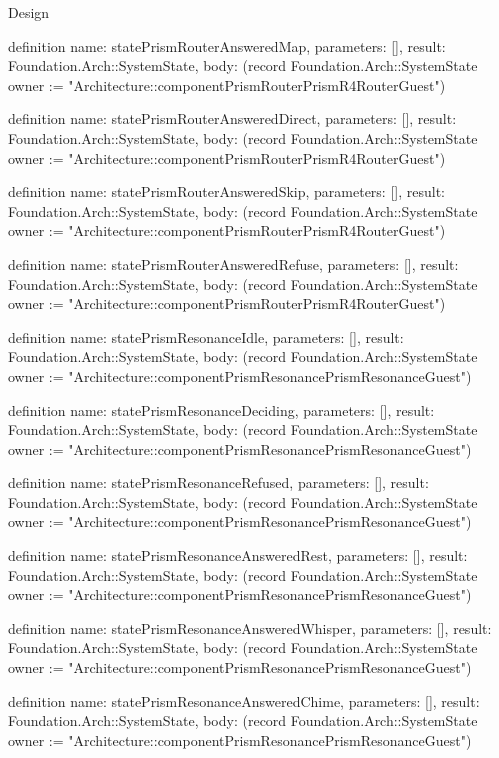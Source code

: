 \begin{lexlean}{Design}
\begin{semanticmodule}
definition{
  name: statePrismRouterAnsweredMap,
  parameters: [],
  result: Foundation.Arch::SystemState,
  body: (record Foundation.Arch::SystemState {owner := "Architecture::componentPrismRouterPrismR4RouterGuest"})
}

definition{
  name: statePrismRouterAnsweredDirect,
  parameters: [],
  result: Foundation.Arch::SystemState,
  body: (record Foundation.Arch::SystemState {owner := "Architecture::componentPrismRouterPrismR4RouterGuest"})
}

definition{
  name: statePrismRouterAnsweredSkip,
  parameters: [],
  result: Foundation.Arch::SystemState,
  body: (record Foundation.Arch::SystemState {owner := "Architecture::componentPrismRouterPrismR4RouterGuest"})
}

definition{
  name: statePrismRouterAnsweredRefuse,
  parameters: [],
  result: Foundation.Arch::SystemState,
  body: (record Foundation.Arch::SystemState {owner := "Architecture::componentPrismRouterPrismR4RouterGuest"})
}

definition{
  name: statePrismResonanceIdle,
  parameters: [],
  result: Foundation.Arch::SystemState,
  body: (record Foundation.Arch::SystemState {owner := "Architecture::componentPrismResonancePrismResonanceGuest"})
}

definition{
  name: statePrismResonanceDeciding,
  parameters: [],
  result: Foundation.Arch::SystemState,
  body: (record Foundation.Arch::SystemState {owner := "Architecture::componentPrismResonancePrismResonanceGuest"})
}

definition{
  name: statePrismResonanceRefused,
  parameters: [],
  result: Foundation.Arch::SystemState,
  body: (record Foundation.Arch::SystemState {owner := "Architecture::componentPrismResonancePrismResonanceGuest"})
}

definition{
  name: statePrismResonanceAnsweredRest,
  parameters: [],
  result: Foundation.Arch::SystemState,
  body: (record Foundation.Arch::SystemState {owner := "Architecture::componentPrismResonancePrismResonanceGuest"})
}

definition{
  name: statePrismResonanceAnsweredWhisper,
  parameters: [],
  result: Foundation.Arch::SystemState,
  body: (record Foundation.Arch::SystemState {owner := "Architecture::componentPrismResonancePrismResonanceGuest"})
}

definition{
  name: statePrismResonanceAnsweredChime,
  parameters: [],
  result: Foundation.Arch::SystemState,
  body: (record Foundation.Arch::SystemState {owner := "Architecture::componentPrismResonancePrismResonanceGuest"})
}


\end{semanticmodule}
\end{lexlean}
